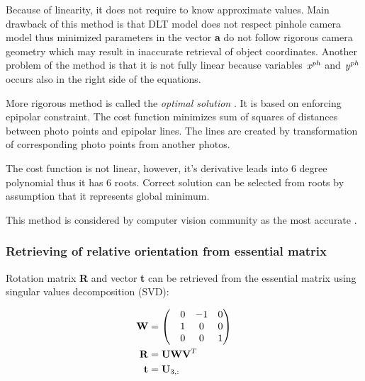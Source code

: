 \documentclass[a4paper,12pt]{article}
\newcommand{\ematr}[1]{%
{\bf #1}%
}
\newcommand{\evect}[1]{%
{\bf #1}%
}
\newcommand{\escal}[1]{%
{\it #1}%
}
\newcommand{\term}[1]{%
{\it #1}%
}
\begin{document}

Because of linearity, it does not require to know approximate values. 
Main drawback of this method is that DLT model does not respect pinhole camera model thus
minimized parameters in the vector \evect{a} do not follow rigorous camera geometry which 
may result in inaccurate retrieval of object coordinates. Another problem of the method 
is that it is not fully linear because variables $\escal{x}^{ph}$ and $\escal{y}^{ph}$
occurs also in the right side of the equations. 


More rigorous method is called the \term{optimal solution}. 
It is based on enforcing epipolar constraint.  The cost function 
minimizes sum of squares of distances between photo points and epipolar lines.
The lines are created 
by transformation of corresponding photo points from another photos.

The cost function is not linear, however, it's derivative leads into 6 degree polynomial thus 
it has 6 roots. Correct solution can be selected from roots by assumption that it represents global minimum. 

This method is considered by computer vision community as the most accurate \cite[p. 315]{Hartley2004}.  

\subsubsection{Retrieving of relative orientation from essential matrix}
\label{sec:ess_eo}



Rotation matrix \ematr{R} and vector \evect{t} can be retrieved from the essential matrix using 
singular values decomposition (SVD):


\begin{equation}
\begin{split}
\ematr{W} &=
\begin{pmatrix}
& 0 & -1 & 0 \\
& 1 & 0 & 0 \\
& 0 & 0 & 1\\
\end{pmatrix} \\
 \ematr{R} &= \ematr{U}  \ematr{W} \ematr{V}^{T}\\
 \evect{t} &= \evect{U}_{3,:}
\end{split}
\end{equation}
\end{document}
